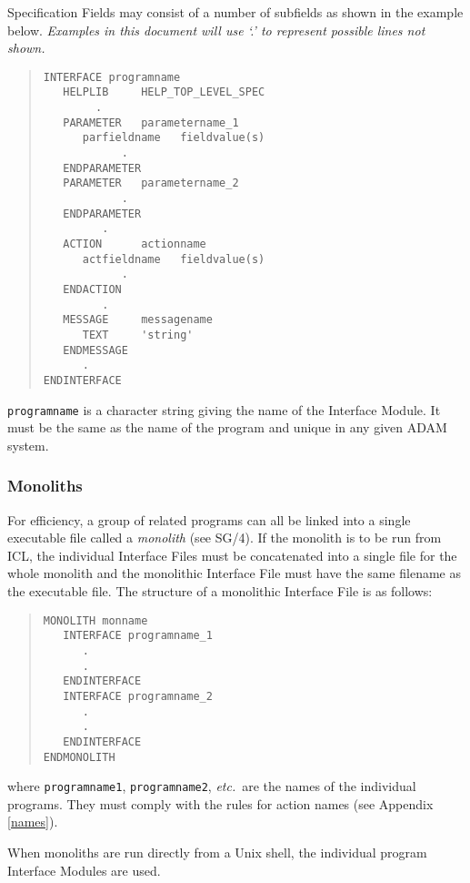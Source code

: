 \documentclass[twoside,11pt]{article}
\newcommand{\xref}[3]{#1}
\renewcommand{\_}{\texttt{\symbol{95}}}
\begin{document}
Specification Fields may consist of a number of subfields as shown in the
example below.
{\em Examples in this document will use `.' to represent possible lines not
shown.}
\begin{quote} \begin{verbatim}
INTERFACE programname
   HELPLIB     HELP_TOP_LEVEL_SPEC
        .
   PARAMETER   parametername_1
      parfieldname   fieldvalue(s)
            .
   ENDPARAMETER
   PARAMETER   parametername_2
            .
   ENDPARAMETER
         .
   ACTION      actionname
      actfieldname   fieldvalue(s)
            .
   ENDACTION
         .
   MESSAGE     messagename
      TEXT     'string'
   ENDMESSAGE
      .
ENDINTERFACE
\end{verbatim} \end{quote}
\texttt{programname} is a character string giving the name of the Interface
Module.
It must be the same as the name of the program and unique in any given ADAM
system.


\subsubsection{Monoliths}
For efficiency, a group of related programs can all be
linked into a single executable file called a {\em monolith} (see
\xref{SG/4}{sg4}{}).
If the monolith is to be run from ICL, the individual Interface Files must
be concatenated into a single file for the whole monolith and the monolithic
Interface File must have the same filename as the executable file.
The structure of a monolithic Interface File is as follows:
\begin{quote} \begin{verbatim}
MONOLITH monname
   INTERFACE programname_1
      .
      .
   ENDINTERFACE
   INTERFACE programname_2
      .
      .
   ENDINTERFACE
ENDMONOLITH
\end{verbatim} \end{quote}
where \texttt{programname\_1}, \texttt{programname\_2}, {\em etc.}\ are the names of
the individual programs. They must comply with the rules for action names
(see Appendix \ref{names}).

When monoliths are run directly from a Unix shell, the individual program
Interface Modules are used.
\end{document}

